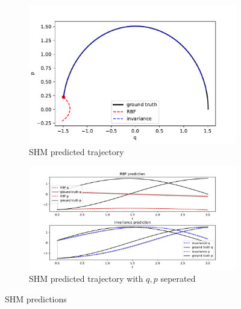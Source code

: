 \documentclass{statsmsc}
\begin{document}
\begin{figure}[H]
     \centering
     \begin{subfigure}[b]{0.6\linewidth}
        \centering
        \includegraphics[width=\linewidth]{../codes/figures/shm_predicted_trajectory.pdf}
        \caption{SHM predicted trajectory}
        \label{fig:shm_prediction_combined}
     \end{subfigure}
     \hfill
     \begin{subfigure}[b]{0.6\linewidth}
         \centering
         \includegraphics[width=\linewidth]{../codes/figures/shm_predicted_trajectory_seperate.pdf}
         \caption{SHM predicted trajectory with $q, p$ seperated}
         \label{fig:shm_prediction_seperate}
     \end{subfigure}
        \caption{SHM predictions}
        \label{fig:shm_prediction}
\end{figure}
\end{document}
